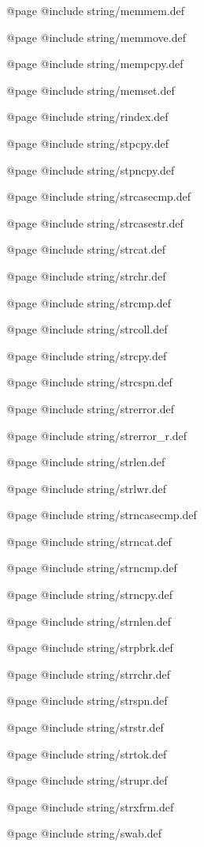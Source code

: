 @page
@include string/memmem.def

@page
@include string/memmove.def

@page
@include string/mempcpy.def

@page
@include string/memset.def

@page
@include string/rindex.def

@page
@include string/stpcpy.def

@page
@include string/stpncpy.def

@page
@include string/strcasecmp.def

@page
@include string/strcasestr.def

@page
@include string/strcat.def

@page
@include string/strchr.def

@page
@include string/strcmp.def

@page
@include string/strcoll.def

@page
@include string/strcpy.def

@page
@include string/strcspn.def

@page
@include string/strerror.def

@page
@include string/strerror_r.def

@page
@include string/strlen.def

@page
@include string/strlwr.def

@page
@include string/strncasecmp.def

@page
@include string/strncat.def

@page
@include string/strncmp.def

@page
@include string/strncpy.def

@page
@include string/strnlen.def

@page
@include string/strpbrk.def

@page
@include string/strrchr.def

@page
@include string/strspn.def

@page
@include string/strstr.def

@page
@include string/strtok.def

@page
@include string/strupr.def

@page
@include string/strxfrm.def

@page
@include string/swab.def
